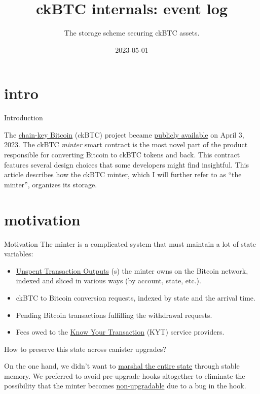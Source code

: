 \documentclass{article}
\title{ckBTC internals: event log}
\subtitle{The storage scheme securing ckBTC assets.}
\date{2023-05-01}
\begin{document}
\section{intro}{Introduction}
  
The \href{https://medium.com/dfinity/chain-key-bitcoin-a-decentralized-bitcoin-twin-ceb8f4ddf95e}{chain-key Bitcoin} (ckBTC) project became \href{https://twitter.com/dfinity/status/1642887821731004418}{publicly available} on April 3, 2023.
The ckBTC \emph{minter} smart contract is the most novel part of the product responsible for converting Bitcoin to ckBTC tokens and back.
This contract features several design choices that some developers might find insightful.
This article describes how the ckBTC minter, which I will further refer to as ``the minter'', organizes its storage.

\section{motivation}{Motivation}
The minter is a complicated system that must maintain a lot of state variables:

\begin{itemize}
    \item
    \href{https://en.wikipedia.org/wiki/Unspent_transaction_output}{Unspent Transaction Outputs} (s) the minter owns on the Bitcoin network, indexed and sliced in various ways (by account, state, etc.).
    \item
    ckBTC to Bitcoin conversion requests, indexed by state and the arrival time.
    \item
    Pending Bitcoin transactions fulfilling the withdrawal requests.
    \item
    Fees owed to the \href{https://thepaypers.com/expert-opinion/know-your-transaction-kyt-the-key-to-combating-transaction-laundering--1246231}{Know Your Transaction} (KYT) service providers.
\end{itemize}

How to preserve this state across canister upgrades?

On the one hand, we didn't want to \href{/posts/11-ii-stable-memory.html#conventional-memory-management}{marshal the entire state} through stable memory.
We preferred to avoid pre-upgrade hooks altogether to eliminate the possibility that the minter becomes \href{/posts/01-effective-rust-canisters.html#upgrade-hook-panics}{non-upgradable} due to a bug in the hook.
\end{document}
